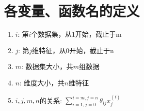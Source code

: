 \section{各变量、函数名的定义}
\begin{enumerate}
	\item $i$: 第$i$个数据集，从1开始，截止于m
	\item $j$: 第$j$维特征，从0开始，截止于n
	\item $m$: 数据集大小，共$m$组数据
	\item $n$: 维度大小，共$n$维特征
	\item $i, j, m, n$的关系: $\sum_{i=1, j=0}^{i=m, j=n}{\theta_{ij}x_j^{(i)}}$
\end{enumerate}